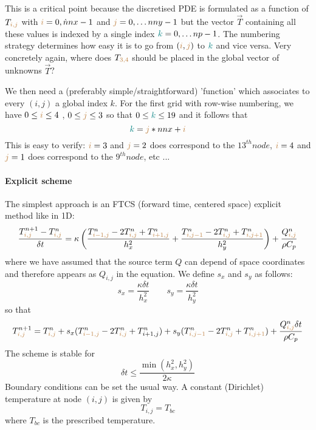 This is a critical point because the discretised PDE is formulated as a function of $T_{{\color{brown} i,j}}$ 
with ${\color{brown}i}=0,\dot nnx-1$ and ${\color{brown}j}=0,\dots nny-1$ 
but the vector $\vec{T}$ containing all these values
is indexed by a single index ${\color{teal}k}=0,\dots np-1$. The numbering strategy determines how easy
it is to go from $({\color{brown}i},{\color{brown}j})$ to ${\color{teal}k}$ and vice versa. 
Very concretely again, where does $T_{\color{brown}3,4}$ should be placed in the global 
vector of unknowns $\vec{T}$?

We then need a (preferably simple/straightforward) 'function' 
which associates to every $(i,j)$ a global index $k$. 
For the first grid with row-wise numbering, we have 
$0\leq {\color{brown}i} \leq 4$ , $0 \leq {\color{brown}j} \leq 3$ 
so that $0 \leq {\color{teal}k} \leq 19$
and it follows that 
\[
{\color{teal} k}={\color{brown}j}*nnx+{\color{brown}i}
\]
This is easy to verify: ${\color{brown}i}=3$ and ${\color{brown}j}=2$ 
does correspond to the $13^{th} node$, 
${\color{brown}i}=4$ and ${\color{brown}j}=1$ does correspond to the $9^{th} node$, etc ...

\begin{minipage}[t]{\textwidth}
\begin{center}

\end{center}
\end{minipage}







\paragraph{Explicit scheme} The simplest approach is an {\color{olive} FTCS} 
(forward time, centered space) explicit method like in 1D:
\[
\frac{T_{{\color{brown}i,j}}^{n+1}-T_{{\color{brown}i,j}}^n}{\delta t}
= \kappa
\left(
\frac{ T_{{\color{brown}i-1,j}}^{n}-2T_{{\color{brown}i,j}}^{n}+T_{{\color{brown}i+1,j}}^{n}  }{h_x^2} + 
\frac{ T_{{\color{brown}i,j-1}}^{n}-2T_{{\color{brown}i,j}}^{n}+T_{{\color{brown}i,j+1}}^{n}  }{h_y^2}
\right)
+\frac{Q_{{\color{brown}i,j}}^n}{\rho C_p}
\]
where we have assumed that the source term $Q$ can depend of space coordinates and therefore 
appears as $Q_{i,j}$ in the equation.
We define $s_x$ and $s_y$ as follows:
\[
s_x = \frac{\kappa \delta t}{h_x^2}
\quad\quad
s_y = \frac{\kappa \delta t}{h_y^2}
\]
so that
\[
T_{{\color{brown}i,j}}^{n+1} = T_{{\color{brown}i,j}}^n 
+ s_x ( T_{{\color{brown}i-1,j}}^{n}
-2T_{{\color{brown}i,j}}^{n}+T_{i+1,j}^{n} ) 
+s_y ( T_{{\color{brown}i,j-1}}^{n}
-2T_{{\color{brown}i,j}}^{n}
+T_{{\color{brown}i,j+1}}^{n} ) + 
\frac{Q_{{\color{brown}i,j}}^n \delta t}{\rho C_p}
\]
The scheme is stable for  
\[
\delta t \leq \frac{\min(h_x^2,h_y^2)}{2 \kappa}
\]
Boundary conditions can be set the usual way. A constant (Dirichlet) temperature 
at node $(i,j)$ is given by
\[
T_{i,j}=T_{bc} 
\]
where $T_{bc}$ is the prescribed temperature. 

